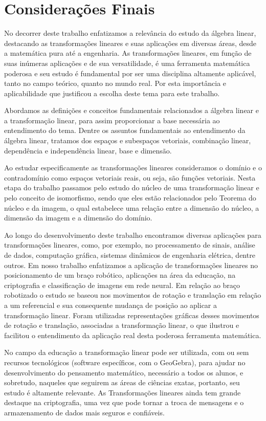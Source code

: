 \chapter{Considerações Finais}
No decorrer deste trabalho enfatizamos a relevância do estudo da álgebra linear, destacando as transformações lineares e suas aplicações em diversas áreas, desde a matemática pura até a engenharia. As transformações lineares, em função de suas inúmeras aplicações e de sua versatilidade, é uma ferramenta matemática poderosa e seu estudo é fundamental por ser uma disciplina altamente aplicável, tanto no campo teórico, quanto no mundo real. Por esta importância e aplicabilidade que justificou a escolha deste tema para este trabalho.

Abordamos as definições e conceitos fundamentais relacionados a álgebra linear e a transformação linear, para assim proporcionar a base necessária ao entendimento do tema. Dentre os assuntos fundamentais ao entendimento da álgebra linear, tratamos dos espaços e subespaços vetoriais, combinação linear, dependência e independência linear, base e dimensão.

Ao estudar especificamente as transformações lineares consideramos o domínio e o contradomínio como espaços vetoriais reais, ou seja, são funções vetoriais. Nesta etapa do trabalho passamos pelo estudo do núcleo de uma transformação linear e pelo conceito de isomorfismo, sendo que eles estão relacionados pelo Teorema do núcleo e da imagem, o qual estabelece uma relação entre a dimensão do núcleo, a dimensão da imagem e a dimensão do domínio.

Ao longo do desenvolvimento deste trabalho encontramos diversas aplicações para transformações lineares, como, por exemplo, no processamento de sinais, análise de dados, computação gráfica, sistemas dinâmicos de engenharia elétrica, dentre outros. Em nosso trabalho enfatizamos a aplicação de transformações lineares no posicionamento de um braço robótico, aplicações na área da educação, na criptografia e classificação de imagens em rede neural. Em relação ao braço robotizado o estudo se baseou nos movimentos de rotação e translação em relação a um referencial e sua consequente mudança de posição ao aplicar a transformação linear. Foram utilizadas representações gráficas desses movimentos de rotação e translação, associadas a transformação linear, o que ilustrou e facilitou o entendimento da aplicação real desta poderosa  ferramenta matemática.

No campo da educação a transformação linear pode ser utilizada, com ou sem recursos tecnológicos (software específicos, com o GeoGebra), para ajudar no desenvolvimento do pensamento matemático, necessário a todos os alunos, e sobretudo, naqueles que seguirem as áreas de ciências exatas, portanto, seu estudo é altamente relevante. As Transformações lineares ainda tem grande destaque na criptografia, uma vez que pode tornar a troca de mensagens e o armazenamento de dados mais seguros e confiáveis.

